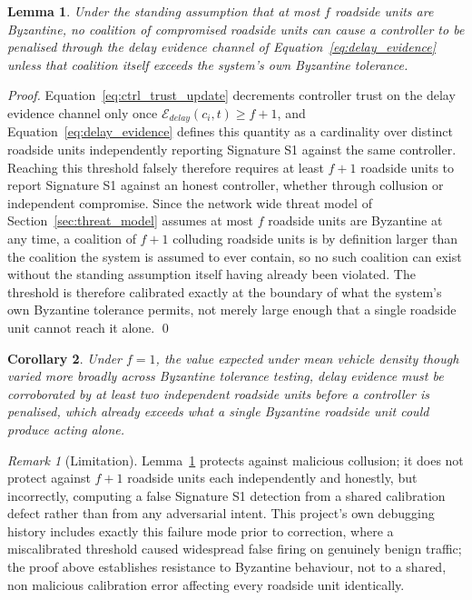 \documentclass[final,5p,twocolumn]{elsarticle}
\newtheorem{lemma}{Lemma}
\newtheorem{corollary}[lemma]{Corollary}
\theoremstyle{remark}
\newtheorem{remark}{Remark}
\theoremstyle{plain}
\begin{document}
\begin{lemma}
	\label{lem:delay_evidence_bft}
	Under the standing assumption that at most $f$ roadside units are
	Byzantine, no coalition of compromised roadside units can cause a
	controller to be penalised through the delay evidence channel of
	Equation~\eqref{eq:delay_evidence} unless that coalition itself
	exceeds the system's own Byzantine tolerance.
\end{lemma}
\begin{proof}
	Equation~\eqref{eq:ctrl_trust_update} decrements controller trust on
	the delay evidence channel only once
	$\mathcal{E}_{delay}(c_i,t) \geq f{+}1$, and
	Equation~\eqref{eq:delay_evidence} defines this quantity as a
	cardinality over distinct roadside units independently reporting
	Signature S1 against the same controller. Reaching this threshold
	falsely therefore requires at least $f{+}1$ roadside units to report
	Signature S1 against an honest controller, whether through collusion
	or independent compromise. Since the network wide threat model of
	Section~\ref{sec:threat_model} assumes at most $f$ roadside units are
	Byzantine at any time, a coalition of $f{+}1$ colluding roadside units
	is by definition larger than the coalition the system is assumed to
	ever contain, so no such coalition can exist without the standing
	assumption itself having already been violated. The threshold is
	therefore calibrated exactly at the boundary of what the system's own
	Byzantine tolerance permits, not merely large enough that a single
	roadside unit cannot reach it alone.
	\qed
\end{proof}

\begin{corollary}
	Under $f{=}1$, the value expected under mean vehicle density though
	varied more broadly across Byzantine tolerance testing, delay
	evidence must be corroborated by at least two independent roadside
	units before a controller is penalised, which already exceeds what a
	single Byzantine roadside unit could produce acting alone.
\end{corollary}

\begin{remark}[Limitation]
	Lemma~\ref{lem:delay_evidence_bft} protects against malicious
	collusion; it does not protect against $f{+}1$ roadside units each
	independently and honestly, but incorrectly, computing a false
	Signature S1 detection from a shared calibration defect rather than
	from any adversarial intent. This project's own debugging history
	includes exactly this failure mode prior to correction, where a
	miscalibrated threshold caused widespread false firing on genuinely
	benign traffic; the proof above establishes resistance to Byzantine
	behaviour, not to a shared, non malicious calibration error affecting
	every roadside unit identically.
\end{remark}
\end{document}
